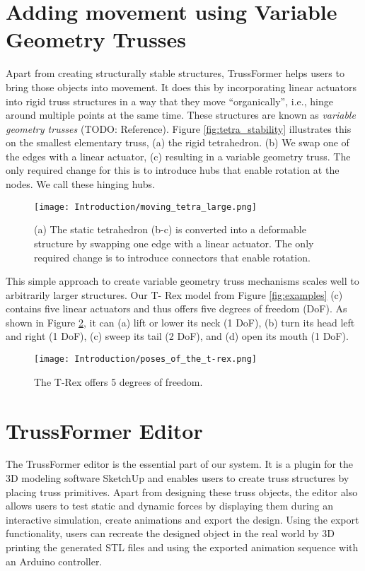 \section{Adding movement using Variable Geometry Trusses}
Apart from creating structurally stable structures, TrussFormer helps users to bring those objects into movement. It does this by incorporating linear actuators into rigid truss structures in a way that they move ``organically'', i.e., hinge around multiple points at the same time. These structures are known as \textit{variable geometry trusses} (TODO: Reference).
Figure \ref{fig:tetra_stability} illustrates this on the smallest elementary truss, (a) the rigid tetrahedron. (b) We swap one of the edges with a linear actuator, (c) resulting in a variable geometry truss. The only required change for this is to introduce hubs that enable rotation at the nodes. We call these hinging hubs.
\begin{figure}[h!]
    \texttt{[image: Introduction/moving\_tetra\_large.png]}
    \centering
    \caption{(a) The static tetrahedron (b-c) is converted into a deformable structure by swapping one edge with a linear actuator. The only required change is to introduce connectors that enable rotation.}
    \label{fig:moving_tetra}
\end{figure}
This simple approach to create variable geometry truss mechanisms scales well to arbitrarily larger structures. Our T- Rex model from Figure \ref{fig:examples} (c) contains five linear actuators and thus offers five degrees of freedom (DoF). As shown in Figure \ref{fig:t-rex_poses}, it can (a) lift or lower its neck (1 DoF), (b) turn its head left and right (1 DoF), (c) sweep its tail (2 DoF), and (d) open its mouth (1 DoF).
\begin{figure}[h!]
    \texttt{[image: Introduction/poses\_of\_the\_t-rex.png]}
    \centering
    \caption{The T-Rex offers 5 degrees of freedom.}
    \label{fig:t-rex_poses}
\end{figure}

\section{TrussFormer Editor}
The TrussFormer editor is the essential part of our system. It is a plugin for the 3D modeling software SketchUp and enables users to create truss structures by placing truss primitives. Apart from designing these truss objects, the editor also allows users to test static and dynamic forces by displaying them during an interactive simulation, create animations and export the design. Using the export functionality, users can recreate the designed object in the real world by 3D printing the generated STL files and using the exported animation sequence with an Arduino controller.
